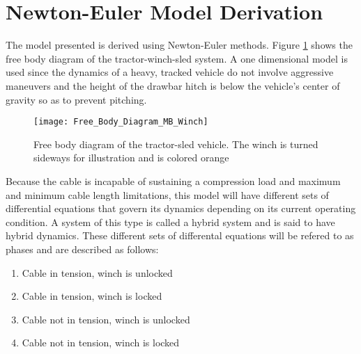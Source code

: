 \section{Newton-Euler Model Derivation}
\label{s:Winch_Model_Derivation}
The model presented is derived using Newton-Euler methods. Figure \ref{fig:Free_Body_Diagram_MBW} shows the free body diagram of the tractor-winch-sled system. A one dimensional model is used since the dynamics of a heavy, tracked vehicle do not involve aggressive maneuvers and the height of the drawbar hitch is below the vehicle's center of gravity so as to prevent pitching. 
\begin{figure}[tb]
    \centering
    \texttt{[image: Free\_Body\_Diagram\_MB\_Winch]}
    \caption{Free body diagram of the tractor-sled vehicle. The winch is turned sideways for illustration and is colored orange}
    \label{fig:Free_Body_Diagram_MBW}
\end{figure}
Because the cable is incapable of sustaining a compression load and maximum and minimum cable length limitations, this model will have different sets of differential equations that govern its dynamics depending on its current operating condition. A system of this type is called a hybrid system and is said to have hybrid dynamics. These different sets of differental equations will be refered to as phases and are described as follows:
\begin{singlespace}
\centering
\vspace{-10pt}
\begin{enumerate}
    \item Cable in tension, winch is unlocked
    \item Cable in tension, winch is locked
    \item Cable not in tension, winch is unlocked
    \item Cable not in tension, winch is locked
\end{enumerate}
\end{singlespace}

